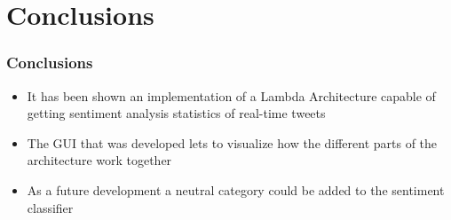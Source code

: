 \documentclass[xcolor=table, unknownkeysallowed]{beamer}
\begin{document}

\section{Conclusions}

\begin{frame}
\frametitle{Conclusions}
\begin{itemize}
\item It has been shown an implementation of a Lambda Architecture capable of getting sentiment analysis statistics of real-time tweets
\vspace{0.75cm}
\item The GUI that was developed lets to visualize how the different parts of the architecture work together
\vspace{0.75cm}
\item As a future development a neutral category could be added to the sentiment classifier
\end{itemize}
\end{frame}
\end{document}

